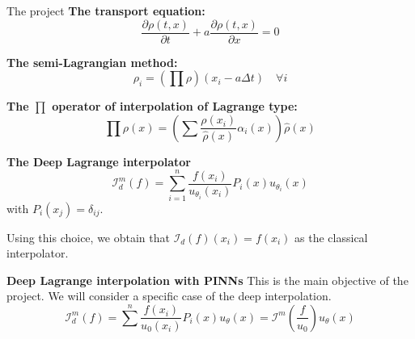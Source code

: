 \begin{frame}{The project}
\textbf{The transport equation:}
\begin{equation*}
    \frac{\partial \rho(t,x)}{\partial t} + a \frac{\partial \rho(t,x)}{\partial x} = 0
\end{equation*}
    
\textbf{The semi-Lagrangian method:}
\begin{equation*}
    \rho_{i}= \left(\prod \rho\right)(x_{i} - a \Delta t) \quad \forall i
\end{equation*}

\textbf{The $\prod$ operator of interpolation of Lagrange type:}
\begin{equation*}
     \prod \rho(x)= \left(\sum \frac{\rho(x_{i})}{\hat{\rho}(x)} \alpha_i(x)\right) \hat{\rho}(x)
\end{equation*}   

\textbf{The Deep Lagrange interpolator}
\begin{equation*}
\mathcal{I}_d^m(f)=\sum_{i=1}^n \frac{f\left(x_i\right)}{u_{\theta_i}\left(x_i\right)} P_i(x) u_{\theta_i}(x)
\end{equation*}  
with $P_i\left(x_j\right)=\delta_{i j}$.

Using this choice, we obtain that $\mathcal{I}_d(f)\left(x_i\right)=f\left(x_i\right)$ as the classical interpolator.

\textbf{Deep Lagrange interpolation with PINNs}
This is the main objective of the project. We will consider a specific case of the deep interpolation.
$$
\mathcal{I}_d^m(f)=\sum^n \frac{f\left(x_i\right)}{u_0\left(x_i\right)} P_i(x) u_\theta(x)=\mathcal{I}^m\left(\frac{f}{u_0}\right) u_\theta(x)
$$

\end{frame}